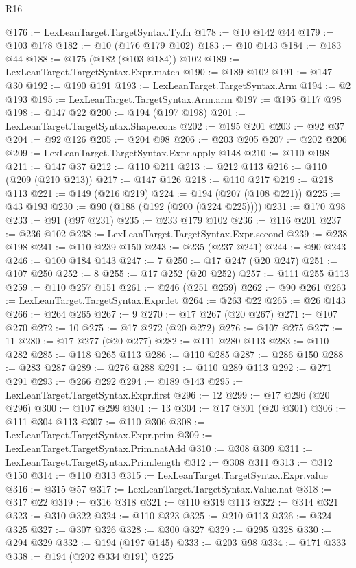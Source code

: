 \begin{lexlean}{R16}
\begin{coremodule}
@176 := LexLeanTarget.TargetSyntax.Ty.fn
@178 := @10 @142 @44
@179 := @103 @178
@182 := @10 (@176 @179 @102)
@183 := @10 @143
@184 := @183 @44
@188 := @175 (@182 (@103 @184)) @102
@189 := LexLeanTarget.TargetSyntax.Expr.match
@190 := @189 @102
@191 := @147 @30
@192 := @190 @191
@193 := LexLeanTarget.TargetSyntax.Arm
@194 := @2 @193
@195 := LexLeanTarget.TargetSyntax.Arm.arm
@197 := @195 @117 @98
@198 := @147 @22
@200 := @194 (@197 @198)
@201 := LexLeanTarget.TargetSyntax.Shape.cons
@202 := @195 @201
@203 := @92 @37
@204 := @92 @126
@205 := @204 @98
@206 := @203 @205
@207 := @202 @206
@209 := LexLeanTarget.TargetSyntax.Expr.apply @148
@210 := @110 @198
@211 := @147 @37
@212 := @110 @211
@213 := @212 @113
@216 := @110 (@209 (@210 @213))
@217 := @147 @126
@218 := @110 @217
@219 := @218 @113
@221 := @149 (@216 @219)
@224 := @194 (@207 (@108 @221))
@225 := @43 @193
@230 := @90 (@188 (@192 (@200 (@224 @225))))
@231 := @170 @98
@233 := @91 (@97 @231)
@235 := @233 @179 @102
@236 := @116 @201
@237 := @236 @102
@238 := LexLeanTarget.TargetSyntax.Expr.second
@239 := @238 @198
@241 := @110 @239 @150
@243 := @235 (@237 @241)
@244 := @90 @243
@246 := @100 @184 @143
@247 := 7
@250 := @17 @247 (@20 @247)
@251 := @107 @250
@252 := 8
@255 := @17 @252 (@20 @252)
@257 := @111 @255 @113
@259 := @110 @257 @151
@261 := @246 (@251 @259)
@262 := @90 @261
@263 := LexLeanTarget.TargetSyntax.Expr.let
@264 := @263 @22
@265 := @26 @143
@266 := @264 @265
@267 := 9
@270 := @17 @267 (@20 @267)
@271 := @107 @270
@272 := 10
@275 := @17 @272 (@20 @272)
@276 := @107 @275
@277 := 11
@280 := @17 @277 (@20 @277)
@282 := @111 @280 @113
@283 := @110 @282
@285 := @118 @265 @113
@286 := @110 @285
@287 := @286 @150
@288 := @283 @287
@289 := @276 @288
@291 := @110 @289 @113
@292 := @271 @291
@293 := @266 @292
@294 := @189 @143
@295 := LexLeanTarget.TargetSyntax.Expr.first
@296 := 12
@299 := @17 @296 (@20 @296)
@300 := @107 @299
@301 := 13
@304 := @17 @301 (@20 @301)
@306 := @111 @304 @113
@307 := @110 @306
@308 := LexLeanTarget.TargetSyntax.Expr.prim
@309 := LexLeanTarget.TargetSyntax.Prim.natAdd
@310 := @308 @309
@311 := LexLeanTarget.TargetSyntax.Prim.length
@312 := @308 @311
@313 := @312 @150
@314 := @110 @313
@315 := LexLeanTarget.TargetSyntax.Expr.value
@316 := @315 @57
@317 := LexLeanTarget.TargetSyntax.Value.nat
@318 := @317 @22
@319 := @316 @318
@321 := @110 @319 @113
@322 := @314 @321
@323 := @310 @322
@324 := @110 @323
@325 := @210 @113
@326 := @324 @325
@327 := @307 @326
@328 := @300 @327
@329 := @295 @328
@330 := @294 @329
@332 := @194 (@197 @145)
@333 := @203 @98
@334 := @171 @333
@338 := @194 (@202 @334 @191) @225

\end{coremodule}
\end{lexlean}
